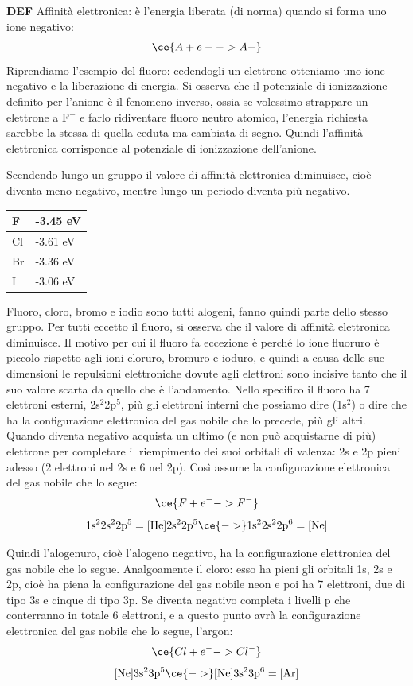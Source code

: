 \textbf{DEF} Affinità elettronica: è l'energia liberata (di norma) quando si forma uno ione negativo:
$$\ce{ A + e- -> A-}$$ 
Riprendiamo l'esempio del fluoro: cedendogli un elettrone otteniamo uno ione negativo e la liberazione di energia. Si osserva che il potenziale di ionizzazione definito per l'anione è il fenomeno inverso, ossia se volessimo strappare un elettrone a F$^-$ e farlo ridiventare fluoro neutro atomico, l'energia richiesta sarebbe la stessa di quella ceduta ma cambiata di segno. Quindi l'affinità elettronica corrisponde al potenziale di ionizzazione dell'anione.

Scendendo lungo un gruppo il valore di affinità elettronica diminuisce, cioè diventa meno negativo, mentre lungo un periodo diventa più negativo.
\begin{center}
    \begin{tabular}{ m{1cm}|m{2cm} } 
     F & -3.45 eV \\ 
     \hline
     Cl & -3.61 eV \\
     \hline
     Br & -3.36 eV \\ 
     \hline
     I & -3.06 eV \\
     \hline
    \end{tabular}
    \end{center}
Fluoro, cloro, bromo e iodio sono tutti alogeni, fanno quindi parte dello stesso gruppo. Per tutti eccetto il fluoro, si osserva che il valore di affinità elettronica diminuisce. Il motivo per cui il fluoro fa eccezione è perché lo ione fluoruro è piccolo rispetto agli ioni cloruro, bromuro e ioduro, e quindi a causa delle sue dimensioni le repulsioni elettroniche dovute agli elettroni sono incisive tanto che il suo valore scarta da quello che è l'andamento. Nello specifico il fluoro ha 7 elettroni esterni, 2s$^2$2p$^5$, più gli elettroni interni che possiamo dire (1s$^2$) o dire che ha la configurazione elettronica del gas nobile che lo precede, più gli altri. Quando diventa negativo acquista un ultimo (e non può acquistarne di più) elettrone per completare il riempimento dei suoi orbitali di valenza: 2s e 2p pieni adesso (2 elettroni nel 2s e 6 nel 2p). Così assume la configurazione elettronica del gas nobile che lo segue:
$$\ce{F + e^- -> F^-}$$
$$\rm 1s^22s^22p^5= [He]2s^22p^5\ce{->}1s^22s^22p^6=[Ne]$$

Quindi l'alogenuro, cioè l'alogeno negativo, ha la configurazione elettronica del gas nobile che lo segue. Analgoamente il cloro: esso ha pieni gli orbitali 1s, 2s e 2p, cioè ha piena la configurazione del gas nobile neon e poi ha 7 elettroni, due di tipo 3s e cinque di tipo 3p. Se diventa negativo completa i livelli p che conterranno in totale 6 elettroni, e a questo punto avrà la configurazione elettronica del gas nobile che lo segue, l'argon:
$$\ce{Cl + e^- -> Cl^-}$$
$$\rm [Ne]3s^23p^5 \ce{->} [Ne]3s^23p^6=[Ar]$$

